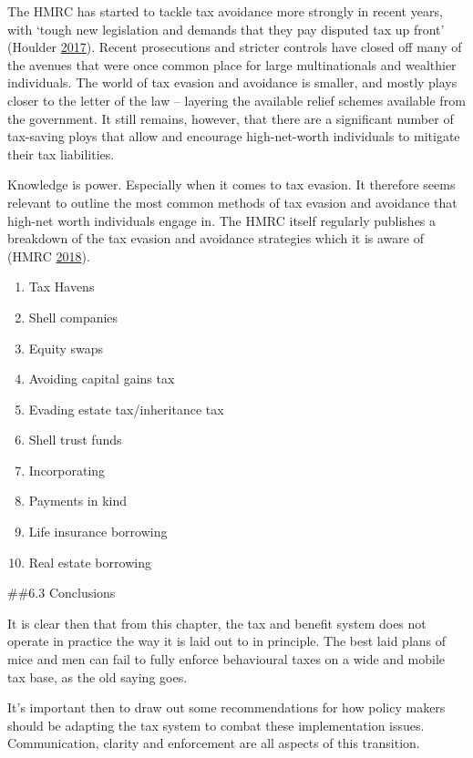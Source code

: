 \documentclass[]{article}
\begin{document}
The HMRC has started to tackle tax avoidance more strongly in recent
years, with `tough new legislation and demands that they pay disputed
tax up front' (Houlder \protect\hyperlink{ref-Houlder2017}{2017}).
Recent prosecutions and stricter controls have closed off many of the
avenues that were once common place for large multinationals and
wealthier individuals. The world of tax evasion and avoidance is
smaller, and mostly plays closer to the letter of the law -- layering
the available relief schemes available from the government. It still
remains, however, that there are a significant number of tax-saving
ploys that allow and encourage high-net-worth individuals to mitigate
their tax liabilities.

Knowledge is power. Especially when it comes to tax evasion. It
therefore seems relevant to outline the most common methods of tax
evasion and avoidance that high-net worth individuals engage in. The
HMRC itself regularly publishes a breakdown of the tax evasion and
avoidance strategies which it is aware of (HMRC
\protect\hyperlink{ref-HMRC2018b}{2018}).

\begin{enumerate}
\def\labelenumi{\arabic{enumi})}
\item
  Tax Havens
\item
  Shell companies
\item
  Equity swaps
\item
  Avoiding capital gains tax
\item
  Evading estate tax/inheritance tax
\item
  Shell trust funds
\item
  Incorporating
\item
  Payments in kind
\item
  Life insurance borrowing
\item
  Real estate borrowing
\end{enumerate}

\#\#6.3 Conclusions

It is clear then that from this chapter, the tax and benefit system does
not operate in practice the way it is laid out to in principle. The best
laid plans of mice and men can fail to fully enforce behavioural taxes
on a wide and mobile tax base, as the old saying goes.

It's important then to draw out some recommendations for how policy
makers should be adapting the tax system to combat these implementation
issues. Communication, clarity and enforcement are all aspects of this
transition.
\end{document}
